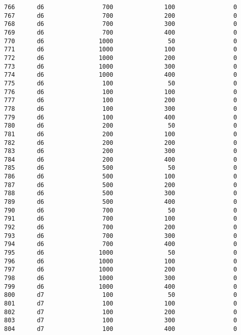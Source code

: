 \documentclass[11pt]{article}
\begin{document}
\begin{Verbatim}[commandchars=\\\{\}]
766      d6                700              100                0   
767      d6                700              200                0   
768      d6                700              300                0   
769      d6                700              400                0   
770      d6               1000               50                0   
771      d6               1000              100                0   
772      d6               1000              200                0   
773      d6               1000              300                0   
774      d6               1000              400                0   
775      d6                100               50                0   
776      d6                100              100                0   
777      d6                100              200                0   
778      d6                100              300                0   
779      d6                100              400                0   
780      d6                200               50                0   
781      d6                200              100                0   
782      d6                200              200                0   
783      d6                200              300                0   
784      d6                200              400                0   
785      d6                500               50                0   
786      d6                500              100                0   
787      d6                500              200                0   
788      d6                500              300                0   
789      d6                500              400                0   
790      d6                700               50                0   
791      d6                700              100                0   
792      d6                700              200                0   
793      d6                700              300                0   
794      d6                700              400                0   
795      d6               1000               50                0   
796      d6               1000              100                0   
797      d6               1000              200                0   
798      d6               1000              300                0   
799      d6               1000              400                0   
800      d7                100               50                0   
801      d7                100              100                0   
802      d7                100              200                0   
803      d7                100              300                0   
804      d7                100              400                0   

\end{Verbatim}
\end{document}
